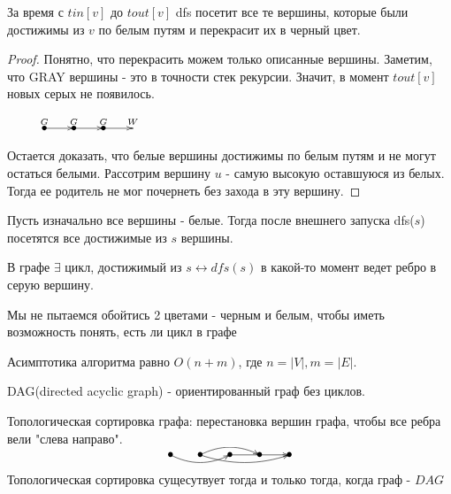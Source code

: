 \begin{lemma}
  За время с $tin[v]$ до $tout[v]$ dfs посетит все те вершины, которые были достижимы из $v$ по белым путям и перекрасит их в черный цвет.
\end{lemma}

\begin{proof}
  Понятно, что перекрасить можем только описанные вершины. Заметим, что GRAY вершины - это в точности стек рекурсии. Значит, в момент $tout[v]$ новых серых не появилось. 

$\xymatrix{
  \ar@{}[r]^>{G} & *=0{\bullet} \ar[r]^>{G}& *=0{\bullet}\ar[r]^>{G}  &  *=0{\bullet}\ar[r]^>{W} & \\
}$

Остается доказать, что белые вершины достижимы по белым путям и не могут остаться белыми. Рассотрим вершину $u$ - самую высокую оставшуюся из белых. 
Тогда ее родитель не мог почернеть без захода в эту вершину.
\end{proof}
\begin{corollary}
  Пусть изначально все вершины - белые. Тогда после внешнего запуска dfs($s$) посетятся все достижимые из $s$ вершины.
\end{corollary}
\begin{corollary}
  В графе $\exists$ цикл, достижимый из $s \leftrightarrow dfs(s)$ в какой-то момент ведет ребро в серую вершину.  
\end{corollary}

\begin{note}
Мы не пытаемся обойтись 2 цветами - черным и белым, чтобы иметь возможность понять, есть ли цикл в графе
\end{note}
\begin{note}
  Асимптотика алгоритма равно $O(n + m)$, где $n = |V|, m = |E|$.
\end{note}
\begin{definition}
  DAG(directed acyclic graph) - ориентированный граф без циклов.
\end{definition}
\begin{definition}
  Топологическая сортировка графа: перестановка вершин графа, чтобы все ребра вели "слева направо".
  $$\xymatrix{
    *=0{\bullet}\ar@/_/[rr] & *=0{\bullet}\ar@/^/[rr] \ar@/_/[rrr]& *=0{\bullet}\ar[rr]&*=0{\bullet} &*=0{\bullet}\\
  }$$
\end{definition}

\begin{proposition}
Топологическая сортировка сущесутвует тогда и только тогда, когда граф - $DAG$
\end{proposition}

